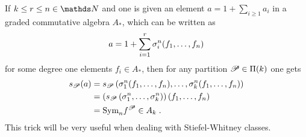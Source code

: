 \begin{Rem}\label{rem:spolyevaluation}
  If $k\leq r\leq n\in\Nat$ and one is given an element $a=1+\sum_{i\geq 1} a_i$
  in a graded commutative algebra $A_*$, which can be written as
  \begin{gather*}
    a = 1 + \sum_{i=1}^{r}\sigma_{i}^{n}(f_1,\dotsc,f_n)
  \end{gather*}
  for some degree one elements $f_i\in A_*$,
  then for any partition $\mathscr{P}\in\Pi({k})$ one gets
  \begin{align*}
    s_{\mathscr{P}}(a)
    &= s_{\mathscr{P}}\left(
      \sigma_{1}^{n}(f_1,\dotsc,f_n),\dotsc, \sigma_{k}^{n}(f_1,\dotsc,f_n)
      \right) \\
    &= \left(
      s_{\mathscr{P}}
      \left( \sigma_{1}^{n}, \dotsc, \sigma_{k}^{n} \right)
      \right)
      (f_1,\dotsc,f_n) \\
    &= \text{\normalfont Sym}_{n} f^{\mathscr{P}} \in A_k
      \;.
  \end{align*}
  This trick will be very useful when dealing with Stiefel-Whitney
  classes.
\end{Rem}

